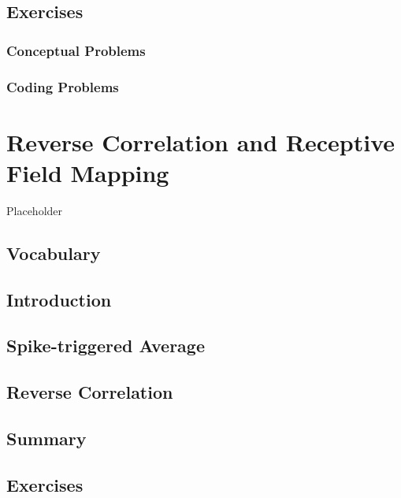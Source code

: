 \documentclass[
]{book}
\begin{document}
\hypertarget{exercises}{%
\section{Exercises}\label{exercises}}

\hypertarget{conceptual-problems}{%
\subsection{Conceptual Problems}\label{conceptual-problems}}

\hypertarget{coding-problems}{%
\subsection{Coding Problems}\label{coding-problems}}

\hypertarget{Ch6}{%
\chapter{Reverse Correlation and Receptive Field Mapping}\label{Ch6}}

Placeholder

\hypertarget{vocabulary}{%
\section{Vocabulary}\label{vocabulary}}

\hypertarget{introduction}{%
\section{Introduction}\label{introduction}}

\hypertarget{spike-triggered-average}{%
\section{Spike-triggered Average}\label{spike-triggered-average}}

\hypertarget{reverse-correlation}{%
\section{Reverse Correlation}\label{reverse-correlation}}

\hypertarget{summary}{%
\section{Summary}\label{summary}}

\hypertarget{exercises}{%
\section{Exercises}\label{exercises}}
\end{document}
